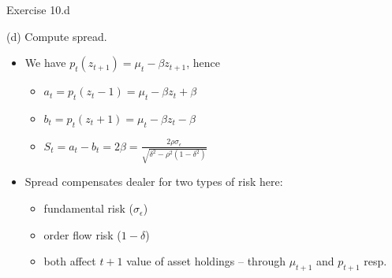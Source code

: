 \documentclass[english,10pt]{beamer}
\begin{document}
\begin{frame}{Exercise 10.d}
	\begin{exampleblock}{}
		(d) Compute spread.
	\end{exampleblock}
	
	\pause
	\begin{itemize}
		\item We have $p_t(z_{t+1}) = \mu_t - \beta z_{t+1}$, hence
		\begin{itemize}
			\item $a_t = p_t(z_t - 1) = \mu_t - \beta z_t + \beta$
			\item $b_t = p_t(z_t + 1) = \mu_t - \beta z_t - \beta$
			\item $S_t = a_t - b_t = 2\beta = \frac{2 \rho \sigma_\epsilon}{\sqrt{\delta^2 - \rho^2(1-\delta^2)}}$
		\end{itemize}
		\item Spread compensates dealer for two types of risk here:
		\begin{itemize}
			\item fundamental risk ($\sigma_\epsilon$)
			\item order flow risk ($1-\delta$)
			\item both affect $t+1$ value of asset holdings -- through $\mu_{t+1}$ and $p_{t+1}$ resp.
		\end{itemize}
	\end{itemize}
\end{frame}
\end{document}
